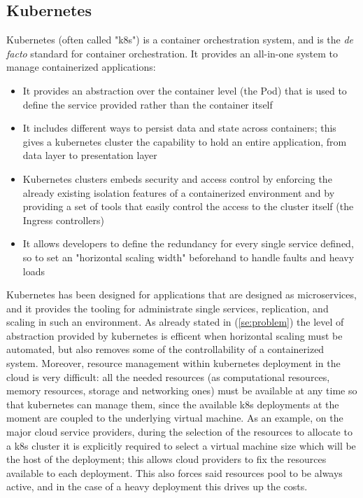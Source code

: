 \subsection{Kubernetes}
\label{sse:kubernetes}
  Kubernetes (often called "k8s") is a container orchestration system, and is the \textit{de facto} standard for container orchestration. It provides an all-in-one system to manage containerized applications:
  \begin{itemize}
    \item It provides an abstraction over the container level (the Pod) that is used to define the service provided rather than the container itself
    \item It includes different ways to persist data and state across containers; this gives a kubernetes cluster the capability to hold an entire application, from data layer to presentation layer
    \item Kubernetes clusters embeds security and access control by enforcing the already existing isolation features of a containerized environment and by providing a set of tools that easily control the access to the cluster itself (the Ingress controllers)
    \item It allows developers to define the redundancy for every single service defined, so to set an "horizontal scaling width" beforehand to handle faults and heavy loads
  \end{itemize}
  Kubernetes has been designed for applications that are designed as microservices, and it provides the tooling for administrate single services, replication, and scaling in such an environment. As already stated in (\ref{se:problem}) the level of abstraction provided by kubernetes is efficent when horizontal scaling must be automated, but also removes some of the controllability of a containerized system. Moreover, resource management within kubernetes deployment in the cloud is very difficult: all the needed resources (as computational resources, memory resources, storage and networking ones) must be available at any time so that kubernetes can manage them, since the available k8s deployments at the moment are coupled to the underlying virtual machine. As an example, on the major cloud service providers, during the selection of the resources to allocate to a k8s cluster it is explicitly required to select a virtual machine size which will be the host of the deployment; this allows cloud providers to fix the resources available to each deployment. This also forces said resources pool to be always active, and in the case of a heavy deployment this drives up the costs. 

